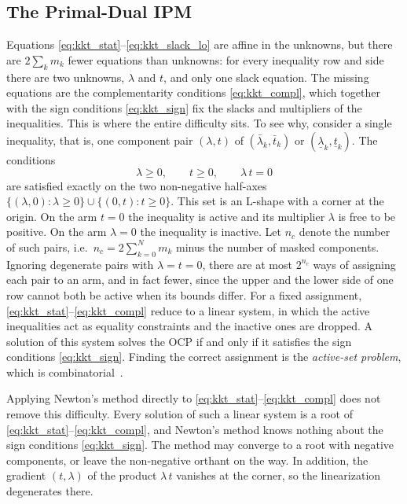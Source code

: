 \subsection{The Primal-Dual IPM}
\label{sec:ipm}

Equations \eqref{eq:kkt_stat}--\eqref{eq:kkt_slack_lo} are affine in the unknowns, but there are $2\sum_k m_k$ fewer equations than unknowns: for every inequality row and side there are two unknowns, $\lambda$ and $t$, and only one slack equation.
The missing equations are the complementarity conditions \eqref{eq:kkt_compl}, which together with the sign conditions \eqref{eq:kkt_sign} fix the slacks and multipliers of the inequalities.
This is where the entire difficulty sits.
To see why, consider a single inequality, that is, one component pair $(\lambda, t)$ of $(\bar{\lambda}_k, \bar{t}_k)$ or $(\underline{\lambda}_k, \underline{t}_k)$.
The conditions
\[
    \lambda \geq 0, \qquad t \geq 0, \qquad \lambda\, t = 0
\]
are satisfied exactly on the two non-negative half-axes $\{(\lambda, 0) : \lambda \geq 0\} \cup \{(0, t) : t \geq 0\}$.
This set is an L-shape with a corner at the origin.
On the arm $t = 0$ the inequality is active and its multiplier $\lambda$ is free to be positive.
On the arm $\lambda = 0$ the inequality is inactive.
Let $n_c$ denote the number of such pairs, i.e.\ $n_c = 2\sum_{k=0}^{N} m_k$ minus the number of masked components.
Ignoring degenerate pairs with $\lambda = t = 0$, there are at most $2^{n_c}$ ways of assigning each pair to an arm, and in fact fewer, since the upper and the lower side of one row cannot both be active when its bounds differ.
For a fixed assignment, \eqref{eq:kkt_stat}--\eqref{eq:kkt_compl} reduce to a linear system, in which the active inequalities act as equality constraints and the inactive ones are dropped.
A solution of this system solves the OCP if and only if it satisfies the sign conditions \eqref{eq:kkt_sign}.
Finding the correct assignment is the \textit{active-set problem}, which is combinatorial~\cite{ferreau2014qpoases}.

Applying Newton's method directly to \eqref{eq:kkt_stat}--\eqref{eq:kkt_compl} does not remove this difficulty.
Every solution of such a linear system is a root of \eqref{eq:kkt_stat}--\eqref{eq:kkt_compl}, and Newton's method knows nothing about the sign conditions \eqref{eq:kkt_sign}.
The method may converge to a root with negative components, or leave the non-negative orthant on the way.
In addition, the gradient $(t, \lambda)$ of the product $\lambda\, t$ vanishes at the corner, so the linearization degenerates there.

